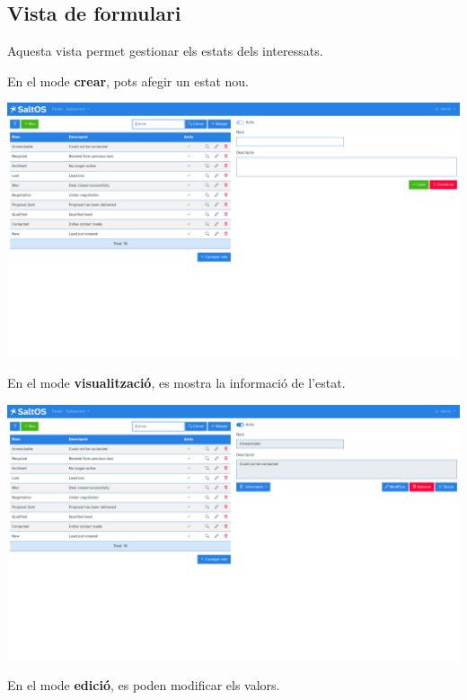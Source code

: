 \documentclass[a4paper]{article}
\begin{document}
\hypertarget{toc64}{}
\subsection{Vista de formulari}

Aquesta vista permet gestionar els estats dels interessats.

En el mode \textbf{crear}, pots afegir un estat nou.

\begin{center}\includegraphics[width=1\textwidth]{../ujest/snaps/test-screenshots-js-screenshots-crm-leads-status-create-ca-es-1-snap.png}\end{center}

En el mode \textbf{visualització}, es mostra la informació de l'estat.

\begin{center}\includegraphics[width=1\textwidth]{../ujest/snaps/test-screenshots-js-screenshots-crm-leads-status-view-10-ca-es-1-snap.png}\end{center}

En el mode \textbf{edició}, es poden modificar els valors.
\end{document}
